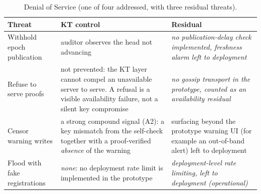 \begin{table}[ht]
\centering
\caption{Denial of Service (one of four addressed, with three residual threats).}
\label{tab:stride-d}
\setlength{\extrarowheight}{2pt}
\footnotesize
\setlength{\tabcolsep}{9pt}\renewcommand{\arraystretch}{1.25}
\begin{tabular}{@{}>{\raggedright\arraybackslash}p{4.4cm}>{\raggedright\arraybackslash}p{5.2cm}>{\raggedright\arraybackslash}p{4.0cm}@{}}
\toprule
Threat & KT control & Residual \\
\midrule
Withhold epoch publication & auditor observes the head not advancing & \emph{no publication-delay check implemented, freshness alarm left to deployment} \\
Refuse to serve proofs & not prevented: the KT layer cannot compel an unavailable server to serve. A refusal is a visible availability failure, not a silent key compromise & \emph{no gossip transport in the prototype, counted as an availability residual} \\
Censor warning writes & a strong compound signal (A2): a key mismatch from the self-check together with a proof-verified \emph{absence} of the warning & surfacing beyond the prototype warning UI (for example an out-of-band alert) left to deployment \\
Flood with fake registrations & \emph{none}: no deployment rate limit is implemented in the prototype & \emph{deployment-level rate limiting, left to deployment (operational)} \\
\bottomrule
\end{tabular}
\end{table}

\FloatBarrier

